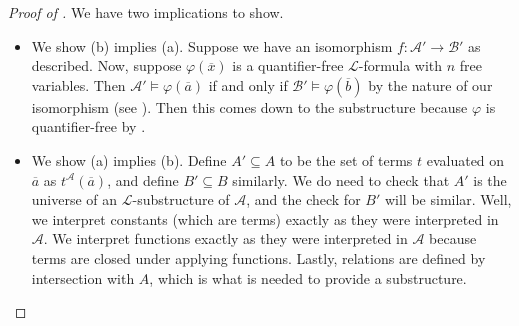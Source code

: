 \documentclass[../notes.tex]{subfiles}
\begin{document}
\begin{proof}[Proof of ]
	We have two implications to show.
	\begin{itemize}
		\item We show (b) implies (a). Suppose we have an isomorphism $f\colon\mathcal A'\to\mathcal B'$ as described. Now, suppose $\varphi(\overline x)$ is a quantifier-free $\mathcal L$-formula with $n$ free variables. Then $\mathcal A'\models\varphi(\overline a)$ if and only if $\mathcal B'\models\varphi(\overline b)$ by the nature of our isomorphism (see ). Then this comes down to the substructure because $\varphi$ is quantifier-free by .
		\item We show (a) implies (b). Define $A'\subseteq A$ to be the set of terms $t$ evaluated on $\overline a$ as $t^\mathcal A(\overline a)$, and define $B'\subseteq B$ similarly. We do need to check that $A'$ is the universe of an $\mathcal L$-substructure of $\mathcal A$, and the check for $B'$ will be similar. Well, we interpret constants (which are terms) exactly as they were interpreted in $\mathcal A$. We interpret functions exactly as they were interpreted in $\mathcal A$ because terms are closed under applying functions. Lastly, relations are defined by intersection with $A$, which is what is needed to provide a substructure.


\end{itemize}
\end{proof}
\end{document}
